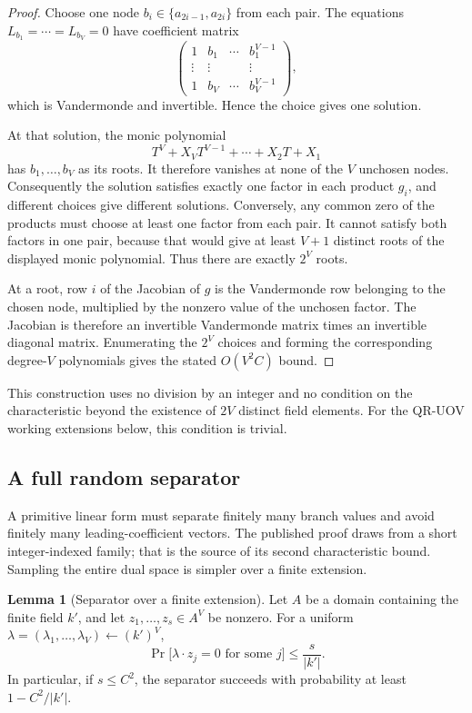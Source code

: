 \documentclass[11pt,a4paper]{article}
\theoremstyle{definition}
\newtheorem{lemma}[theorem]{Lemma}
\theoremstyle{remark}
\begin{document}
\begin{proof}
Choose one node $b_i\in\{a_{2i-1},a_{2i}\}$ from each pair.  The equations
$L_{b_1}=\cdots=L_{b_V}=0$ have coefficient matrix
\[
 \begin{pmatrix}
 1&b_1&\cdots&b_1^{V-1}\\
 \vdots&\vdots&&\vdots\\
 1&b_V&\cdots&b_V^{V-1}
 \end{pmatrix},
\]
which is Vandermonde and invertible.  Hence the choice gives one solution.

At that solution, the monic polynomial
\[
 T^V+X_VT^{V-1}+\cdots+X_2T+X_1
\]
has $b_1,\ldots,b_V$ as its roots.  It therefore vanishes at none of the $V$ unchosen nodes.  Consequently the solution satisfies exactly one factor in each product $g_i$, and different choices give different solutions.  Conversely, any common zero of the products must choose at least one factor from each pair.  It cannot satisfy both factors in one pair, because that would give at least $V+1$ distinct roots of the displayed monic polynomial.  Thus there are exactly $2^V$ roots.

At a root, row $i$ of the Jacobian of $g$ is the Vandermonde row belonging to the chosen node, multiplied by the nonzero value of the unchosen factor.  The Jacobian is therefore an invertible Vandermonde matrix times an invertible diagonal matrix.  Enumerating the $2^V$ choices and forming the corresponding degree-$V$ polynomials gives the stated $O(V^2C)$ bound.
\end{proof}

This construction uses no division by an integer and no condition on the characteristic beyond the existence of $2V$ distinct field elements.  For the QR-UOV working extensions below, this condition is trivial.

\subsection{A full random separator}
A primitive linear form must separate finitely many branch values and avoid finitely many leading-coefficient vectors.  The published proof draws from a short integer-indexed family; that is the source of its second characteristic bound.  Sampling the entire dual space is simpler over a finite extension.

\begin{lemma}[Separator over a finite extension]\label{lem:full-random-separator}
Let $A$ be a domain containing the finite field $k'$, and let
$z_1,\ldots,z_s\in A^V$ be nonzero.  For a uniform
$\lambda=(\lambda_1,\ldots,\lambda_V)\leftarrow(k')^V$,
\begin{equation}\label{eq:separator-bound}
 \Pr\bigl[\lambda\cdot z_j=0\text{ for some }j\bigr]
 \le \frac{s}{|k'|}.
\end{equation}
In particular, if $s\le C^2$, the separator succeeds with probability at least
$1-C^2/|k'|$.
\end{lemma}
\end{document}
